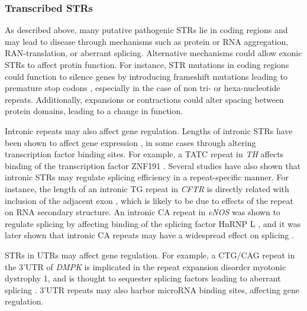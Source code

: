 \subsubsection{Transcribed STRs}
As described above, many putative pathogenic STRs lie in coding regions and may lead to disease through mechanisms such as protein or RNA aggregation, RAN-translation, or aberrant splicing. Alternative mechanisms could allow exonic STRs to affect protin function. For instance, STR mutations in coding regions could function to silence genes by introducing frameshift mutations leading to premature stop codons \cite{GemayelVincesLegendreEtAl2010}, especially in the case of non tri- or hexa-nucleotide repeats. Additionally, expansions or contractions could alter spacing between protein domains, leading to a change in function.

Intronic repeats may also affect gene regulation. Lengths of intronic STRs have been shown to affect gene expression \cite{GebhardtZankerBrandt1999}, in some cases through altering transcription factor binding sites. For example, a TATC repeat in \emph{TH} affects binding of the transcription factor ZNF191 \cite{AlbaneseBiguetKieferEtAl2001}. Several studies have also shown that intronic STRs may regulate splicing efficiency in a repeat-specific manner. For instance, the length of an intronic TG repeat in \emph{CFTR} is directly related with inclusion of the adjacent exon \cite{HefferonGromanYurkEtAl2004}, which is likely to be due to effects of the repeat on RNA secondary structure. An intronic CA repeat in \emph{eNOS} was shown to regulate splicing by affecting binding of the splicing factor HnRNP L \cite{HuiStanglLaneEtAl2003}, and it was later shown that intronic CA repeats may have a widespread effect on splicing \cite{HuiHungHeinerEtAl2005}.

STRs in UTRs may affect gene regulation. For example, a CTG/CAG repeat in the 3'UTR of \emph{DMPK} is implicated in the repeat expansion disorder myotonic dystrophy 1, and is thought to sequester splicing factors leading to aberrant splicing \cite{KoscianskaWitkosKozlowskaEtAl2015}. 3'UTR repeats may also harbor microRNA binding sites, affecting gene regulation.

